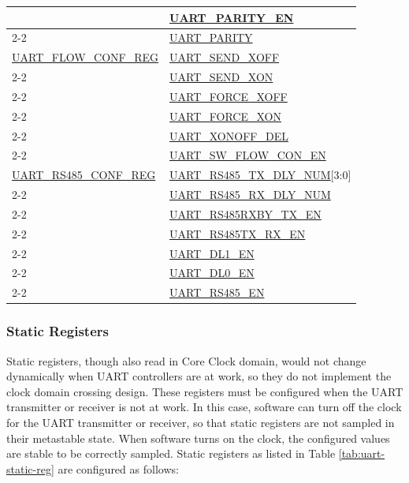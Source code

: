 \documentclass[main\_\_EN.tex]{subfiles}
\begin{document}
\begin{longtable}[c]{|p{6cm}|p{6cm}|}
 & \hyperref[fielddesc:UARTPARITYEN]{UART\_PARITY\_EN} \\\cline{2-2}
 & \hyperref[fielddesc:UARTPARITY]{UART\_PARITY} \\\hline
\clearpage
\hyperref[regdesc:UARTFLOWCONFREG]{UART\_FLOW\_CONF\_REG}  & \hyperref[fielddesc:UARTSENDXOFF]{UART\_SEND\_XOFF} \\\cline{2-2}
 & \hyperref[fielddesc:UARTSENDXON]{UART\_SEND\_XON} \\\cline{2-2}
 & \hyperref[fielddesc:UARTFORCEXOFF]{UART\_FORCE\_XOFF} \\\cline{2-2}
 & \hyperref[fielddesc:UARTFORCEXON]{UART\_FORCE\_XON} \\\cline{2-2}
 & \hyperref[fielddesc:UARTXONOFFDEL]{UART\_XONOFF\_DEL} \\\cline{2-2}
 & \hyperref[fielddesc:UARTSWFLOWCONEN]{UART\_SW\_FLOW\_CON\_EN} \\\hline

\hyperref[regdesc:UARTRS485CONFREG]{UART\_RS485\_CONF\_REG} & \hyperref[fielddesc:UARTRS485TXDLYNUM]{UART\_RS485\_TX\_DLY\_NUM}[3:0] \\\cline{2-2}
 & \hyperref[fielddesc:UARTRS485RXDLYNUM]{UART\_RS485\_RX\_DLY\_NUM} \\\cline{2-2}
 & \hyperref[fielddesc:UARTRS485RXBYTXEN]{UART\_RS485RXBY\_TX\_EN} \\\cline{2-2}
 & \hyperref[fielddesc:UARTRS485TXRXEN]{UART\_RS485TX\_RX\_EN} \\\cline{2-2}
 & \hyperref[fielddesc:UARTDL1EN]{UART\_DL1\_EN} \\\cline{2-2}
 & \hyperref[fielddesc:UARTDL0EN]{UART\_DL0\_EN} \\\cline{2-2}
 & \hyperref[fielddesc:UARTRS485EN]{UART\_RS485\_EN} \\\hline
\end{longtable}

\subsubsection{Static Registers}\label{sec:uart-static-reg}

Static registers, though also read in Core Clock domain, would not change dynamically when UART controllers are at work, so they do not implement the clock domain crossing design. These registers must be configured when the UART transmitter or receiver is not at work. In this case, software can turn off the clock for the UART transmitter or receiver, so that static registers are not sampled in their metastable state. When software turns on the clock, the configured values are stable to be correctly sampled. Static registers as listed in Table \ref{tab:uart-static-reg} are configured as follows:
\end{document}
